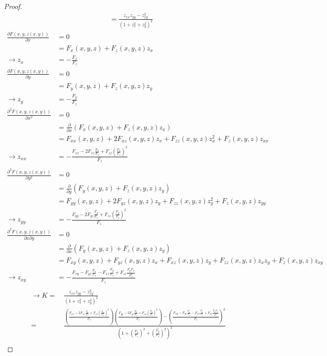 \documentclass[10pt,a4paper]{article}
\begin{document}
\begin{proof}
\begin{align*}
&=\frac{z_{xx}z_{yy}-z_{xy}^2}{(1+z_x^2+z_y^2)^2}
\end{align*}
\begin{align*}
\frac{\partial F(x,y,z(x,y))}{\partial x}&=0\\
&=F_x(x,y,z)+F_z(x,y,z)z_x\\
\rightarrow z_x&=-\frac{F_x}{F_z}\\
\frac{\partial F(x,y,z(x,y))}{\partial y}&=0\\
&=F_y(x,y,z)+F_z(x,y,z)z_y\\
\rightarrow z_y&=-\frac{F_y}{F_z}\\
\frac{\partial^2 F(x,y,z(x,y))}{\partial x^2}&=0\\
&=\frac{\partial}{\partial x}(F_x(x,y,z)+F_z(x,y,z)z_x)\\
&=F_{xx}(x,y,z)+2F_{xz}(x,y,z)z_x+F_{zz}(x,y,z)z_x^2+F_z(x,y,z)z_{xx}\\
\rightarrow z_{xx}&=-\frac{F_{xx}-2F_{xz}\frac{F_x}{F_z}+F_{zz}\left(\frac{F_x}{F_z}\right)^2}{F_z}\\
\end{align*}
\begin{align*}
\frac{\partial^2 F(x,y,z(x,y))}{\partial y^2}&=0\\
&=\frac{\partial}{\partial y}(F_y(x,y,z)+F_z(x,y,z)z_y)\\
&=F_{yy}(x,y,z)+2F_{yz}(x,y,z)z_y+F_{zz}(x,y,z)z_y^2+F_z(x,y,z)z_{yy}\\
\rightarrow z_{yy}&=-\frac{F_{yy}-2F_{yz}\frac{F_y}{F_z}+F_{zz}\left(\frac{F_y}{F_z}\right)^2}{F_z}\\
\frac{\partial^2 F(x,y,z(x,y))}{\partial x\partial y}&=0\\
&=\frac{\partial}{\partial x}(F_y(x,y,z)+F_z(x,y,z)z_y)\\
&=F_{xy}(x,y,z)+F_{yz}(x,y,z)z_x+F_{xz}(x,y,z)z_y+F_{zz}(x,y,z)z_xz_y+F_z(x,y,z)z_{xy}\\
\rightarrow z_{xy}&=-\frac{F_{xy}-F_{yz}\frac{F_x}{F_z}-F_{xz}\frac{F_y}{F_z}+F_{zz}\frac{F_yF_x}{F_z^2}}{F_z}\\
\end{align*}
\begin{align*}
\rightarrow K=&\ \frac{z_{xx}z_{yy}-z_{xy}^2}{(1+z_x^2+z_y^2)^2}\\
=&\ \frac{\left(\frac{F_{xx}-2F_{xz}\frac{F_x}{F_z}+F_{zz}\left(\frac{F_x}{F_z}\right)^2}{F_z}\right)\left(\frac{F_{yy}-2F_{yz}\frac{F_y}{F_z}+F_{zz}\left(\frac{F_y}{F_z}\right)^2}{F_z}\right)-\left(\frac{F_{xy}-F_{yz}\frac{F_x}{F_z}-F_{xz}\frac{F_y}{F_z}+F_{zz}\frac{F_yF_x}{F_z^2}}{F_z}\right)^2}{(1+\left(\frac{F_x}{F_z}\right)^2+\left(\frac{F_y}{F_z}\right)^2)^2}\\

\end{align*}
\end{proof}
\end{document}
